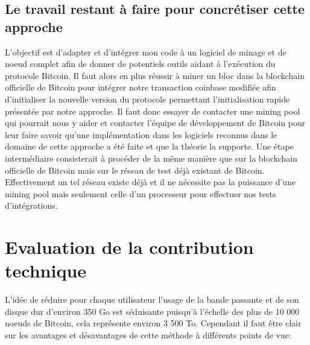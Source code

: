 \documentclass[12pt,a4paper]{article}
\begin{document}
	\subsection{Le travail restant à faire pour concrétiser cette approche}
	
	L'objectif est d'adapter et d'intégrer mon code à un logiciel de minage et de noeud complet afin de donner de potentiels outils aidant à l'exécution du protocole Bitcoin. Il faut alors en plus réussir à miner un bloc dans la blockchain officielle de Bitcoin pour intégrer notre transaction coinbase modifiée afin d'initialiser la nouvelle version du protocole permettant l'initialisation rapide présentée par notre approche. Il faut donc essayer de contacter une mining pool qui pourrait nous y aider et contacter l'équipe de développement de Bitcoin pour leur faire savoir qu'une implémentation dans les logiciels reconnus dans le domaine de cette approche a été faite et que la théorie la supporte. Une étape intermédiaire consisterait à procéder de la même manière que sur la blockchain officielle de Bitcoin mais sur le réseau de test déjà existant de Bitcoin. Effectivement un tel réseau existe déjà et il ne nécessite pas la puissance d'une mining pool mais seulement celle d'un processeur pour effectuer nos tests d'intégrations.\\
		
	\section{Evaluation de la contribution technique} %
	
	L'idée de réduire pour chaque utilisateur l'usage de la bande passante et de son disque dur d'environ 350 Go est séduisante puisqu'à l'échelle des plus de 10 000 noeuds de Bitcoin, cela représente environ 3 500 To. Cependant il faut être clair sur les avantages et désavantages de cette méthode à différents points de vue:
	
\end{document}
